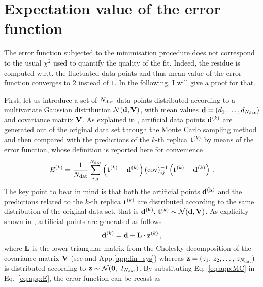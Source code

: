 \chapter{Expectation value of the error function}
\label{app:exp_err_func}

The error function subjected to the minimisation procedure does not correspond to the usual $\chi^2$ used to quantify the quality of the fit. Indeed, the residue is computed w.r.t. the fluctuated data points and thus mean value of the error function converges to $2$ instead of $1$. In the following, I will give a proof for that.%

First, let us introduce a set of $N_{\textrm{dat}}$ data points distributed according to a multivariate Gaussian distribution $\mathcal{N}(\mathbf{d},\mathbf{V})$, with mean values $\mathbf{d} = (d_1, \dots, d_{N_{\textrm{dat}}})$ and covariance matrix $\mathbf{V}$. As explained in , artificial data points $\mathbf{d}^{(k)}$ are generated out of the original data set through the Monte Carlo sampling method and then compared with the predictions of the $k$-th replica $\mathbf{t}^{(k)}$ by means of the error function, whose definition is reported here for convenience
%
\begin{equation}
    E^{(k)} = \frac{1}{N_{\textrm{dat}}} \sum_{i,j}^{N_{\textrm{dat}}} \left( \mathbf{t}^{(k)} - \mathbf{d}^{(k)} \right) (\textrm{cov})^{-1}_{ij} \left( \mathbf{t}^{(k)} - \mathbf{d}^{(k)} \right) \,.
  \label{eq:app:E}
\end{equation}
%
The key point to bear in mind is that both the artificial points $\mathbf{d^{(k)}}$ and the predictions related to the $k$-th replica $\mathbf{t}^{(k)}$ are distributed according to the same distribution of the original data set, that is $\mathbf{d^{(k)}}, \, \mathbf{t}^{(k)} \sim \mathcal{N}(\mathbf{d},\mathbf{V})$. As explicitly shown in , artificial points are generated as follows
%
\begin{equation}
    \mathbf{d}^{(k)} = \mathbf{d} + \mathbf{L} \cdot \mathbf{z}^{(k)} \,,
    \label{eq:app:MC}
\end{equation}
%
where $\mathbf{L}$ is the lower triangular matrix from the Cholesky decomposition of the covariance matrix $\mathbf{V}$ (see  and App.\ref{app:lin_sys}) whereas $\mathbf{z} = (z_1, \, z_2, \dots,\, z_{N_{\textrm{dat}}})$ is distributed according to $\mathbf{z} \sim \mathcal{N}(\mathbf{0},\; I_{N_{\textrm{dat}}})$. By substituting Eq.~\eqref{eq:app:MC} in Eq.~\eqref{eq:app:E}, the error function can be recast as
%

